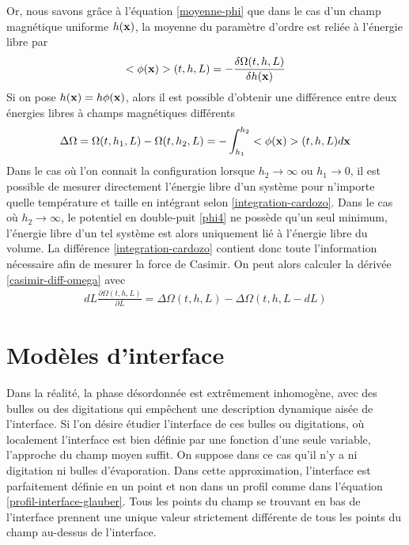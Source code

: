 Or, nous savons grâce à l'équation \ref{moyenne-phi} que dans le cas d'un champ magnétique uniforme $h({\bf x})$, la moyenne du paramètre d'ordre est reliée à l'énergie libre par
\begin{align}
    <\phi({\bf x})>(t,h,L) = - \frac{\delta \Omega(t,h,L)}{\delta h({\bf x})}
\end{align} 
Si on pose $h({\bf x}) = h \phi({\bf x})$, alors il est possible d'obtenir une différence entre deux énergies libres à champs magnétiques différents \cite{lopes_cardozo_critical_2014} 
\begin{align}
    \Delta \Omega = \Omega(t,h_1,L) - \Omega(t,h_2,L) = - \int_{h_1}^{h_2} <\phi({\bf x})>(t,h,L) d{\bf x}
    \label{integration-cardozo}
\end{align}
Dans le cas où l'on connait la configuration lorsque $h_2 \to \infty$ ou $h_1 \to 0$, il est possible de mesurer directement l'énergie libre d'un système pour n'importe quelle température et taille en intégrant selon \ref{integration-cardozo}. Dans le cas où $h_2 \to \infty$, le potentiel en double-puit \ref{phi4} ne possède qu'un seul minimum, l'énergie libre d'un tel système est alors uniquement lié à l'énergie libre du volume.
La différence \ref{integration-cardozo} contient donc toute l'information nécessaire afin de mesurer la force de Casimir. On peut alors calculer la dérivée \ref{casimir-diff-omega} avec
\begin{align}
    dL \frac{\partial \Omega(t,h,L)}{\partial L} = \Delta \Omega(t,h,L)-\Delta \Omega(t,h,L-dL)
\end{align}

    \section{Modèles d'interface}

Dans la réalité, la phase désordonnée est extrêmement inhomogène, avec des bulles ou des digitations qui empêchent une description dynamique aisée de l'interface. Si l'on désire étudier l'interface de ces bulles ou digitations, où localement l'interface est bien définie par une fonction d'une seule variable, l'approche du champ moyen suffit. On suppose dans ce cas qu'il n'y a ni digitation ni bulles d'évaporation. Dans cette approximation, l'interface est parfaitement définie en un point et non dans un profil comme dans l'équation \ref{profil-interface-glauber}. Tous les points du champ se trouvant en bas de l'interface prennent une unique valeur strictement différente de tous les points du champ au-dessus de l'interface. 

